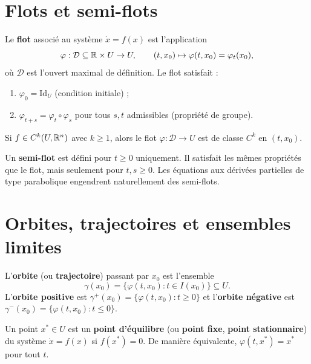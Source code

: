 \section{Flots et semi-flots}

\begin{definition}[Flot]
Le \textbf{flot} associ\'e au syst\`eme $\dot{x} = f(x)$ est l'application
\[
    \varphi : \mathcal{D} \subseteq \mathbb{R} \times U \to U, \qquad
    (t, x_0) \mapsto \varphi(t, x_0) = \varphi_t(x_0),
\]
o\`u $\mathcal{D}$ est l'ouvert maximal de d\'efinition. Le flot satisfait :
\begin{enumerate}
    \item $\varphi_0 = \mathrm{Id}_U$ (condition initiale) ;
    \item $\varphi_{t+s} = \varphi_t \circ \varphi_s$ pour tous $s, t$
    admissibles (propri\'et\'e de groupe).
\end{enumerate}
\end{definition}

\begin{proposition}
Si $f \in C^k(U, \mathbb{R}^n)$ avec $k \geq 1$, alors le flot
$\varphi : \mathcal{D} \to U$ est de classe $C^k$ en $(t, x_0)$.
\end{proposition}

\begin{definition}
Un \textbf{semi-flot} est d\'efini pour $t \geq 0$ uniquement. Il satisfait
les m\^emes propri\'et\'es que le flot, mais seulement pour $t, s \geq 0$.
Les \'equations aux d\'eriv\'ees partielles de type parabolique engendrent
naturellement des semi-flots.
\end{definition}

\section{Orbites, trajectoires et ensembles limites}

\begin{definition}[Orbite]
L'\textbf{orbite} (ou \textbf{trajectoire}) passant par $x_0$ est l'ensemble
\[
    \gamma(x_0) = \{\varphi(t, x_0) : t \in I(x_0)\} \subseteq U.
\]
L'\textbf{orbite positive} est $\gamma^+(x_0) = \{\varphi(t, x_0) : t \geq 0\}$
et l'\textbf{orbite n\'egative} est $\gamma^-(x_0) = \{\varphi(t, x_0) : t \leq 0\}$.
\end{definition}

\begin{definition}
Un point $x^* \in U$ est un \textbf{point d'\'equilibre} (ou \textbf{point fixe},
\textbf{point stationnaire}) du syst\`eme $\dot{x} = f(x)$ si $f(x^*) = 0$.
De mani\`ere \'equivalente, $\varphi(t, x^*) = x^*$ pour tout $t$.
\end{definition}

